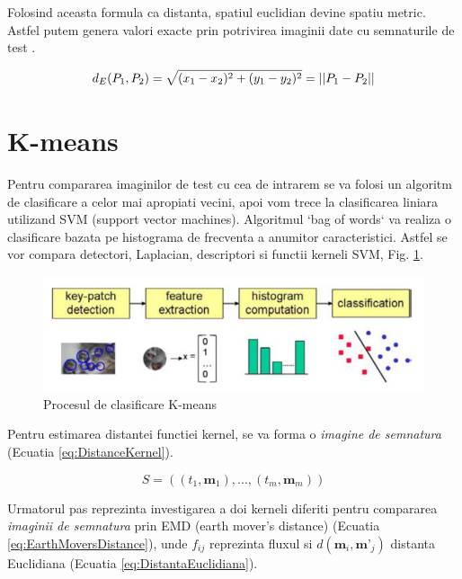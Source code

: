 \documentclass[conference]{IEEEtran}
\begin{document}
Folosind aceasta formula ca distanta, spatiul euclidian devine spatiu metric. Astfel putem genera valori exacte prin potrivirea imaginii date cu semnaturile de test \cite{b6}.

\begin{equation} \label{eq:DistantaEuclidiana}
d_{E}(P_{1},P_{2}) = \sqrt{(x_{1}-x_{2})^2 + (y_{1}-y_{2})^2} = \abs{\abs{P_{1}-P_{2}}}
\end{equation}


\section{K-means}
Pentru compararea imaginilor de test cu cea de intrarem se va folosi un algoritm de clasificare a celor mai apropiati vecini, apoi vom trece la clasificarea liniara utilizand SVM (support vector machines). Algoritmul `bag of words` va realiza o clasificare bazata pe histograma de frecventa a anumitor caracteristici. Astfel se vor compara detectori, Laplacian, descriptori si functii kerneli SVM, Fig. \ref{fig:Kmeans}. \cite{b7}

\begin{figure}[h!]
	\includegraphics[width=\linewidth]{Figures/Kmeans.png}
	\caption{Procesul de clasificare K-means}
	\label{fig:Kmeans}
\end{figure}

Pentru estimarea distantei functiei kernel, se va forma o \textit{imagine de semnatura} (Ecuatia \ref{eq:DistanceKernel}).

\begin{equation} \label{eq:DistanceKernel}
S=((t_{1},\textbf{m}_{1}),...,(t_{m},\textbf{m}_{m}))
\end{equation}

Urmatorul pas reprezinta investigarea a doi kerneli diferiti pentru compararea \textit{imaginii de semnatura} prin EMD (earth mover's distance) (Ecuatia \ref{eq:EarthMoversDistance}), unde $f_{ij}$ reprezinta fluxul si $d(\textbf{m}_{i},\textbf{m'}_{j})$ distanta Euclidiana (Ecuatia \ref{eq:DistantaEuclidiana}).
\end{document}
